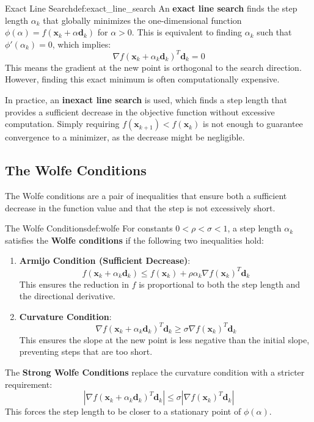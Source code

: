 \documentclass{MathNote}
\begin{document}
\begin{definition}{Exact Line Search}{def:exact_line_search}
	An \textbf{exact line search} finds the step length $\alpha_k$ that globally minimizes the one-dimensional function $\phi(\alpha) = f(\bm{x}_k + \alpha \bm{d}_k)$ for $\alpha > 0$. This is equivalent to finding $\alpha_k$ such that $\phi'(\alpha_k)=0$, which implies:
	$$ \nabla f(\bm{x}_k + \alpha_k \bm{d}_k)^T \bm{d}_k = 0 $$
	This means the gradient at the new point is orthogonal to the search direction. However, finding this exact minimum is often computationally expensive.
\end{definition}

In practice, an \textbf{inexact line search} is used, which finds a step length that provides a sufficient decrease in the objective function without excessive computation. Simply requiring $f(\bm{x}_{k+1}) < f(\bm{x}_k)$ is not enough to guarantee convergence to a minimizer, as the decrease might be negligible.

\subsection{The Wolfe Conditions}

The Wolfe conditions are a pair of inequalities that ensure both a sufficient decrease in the function value and that the step is not excessively short.

\begin{definition}{The Wolfe Conditions}{def:wolfe}
	For constants $0 < \rho < \sigma < 1$, a step length $\alpha_k$ satisfies the \textbf{Wolfe conditions} if the following two inequalities hold:
	\begin{enumerate}
		\item \textbf{Armijo Condition (Sufficient Decrease)}:
		$$ f(\bm{x}_k + \alpha_k \bm{d}_k) \le f(\bm{x}_k) + \rho \alpha_k \nabla f(\bm{x}_k)^T \bm{d}_k $$
		This ensures the reduction in $f$ is proportional to both the step length and the directional derivative.
		\item \textbf{Curvature Condition}:
		$$ \nabla f(\bm{x}_k + \alpha_k \bm{d}_k)^T \bm{d}_k \ge \sigma \nabla f(\bm{x}_k)^T \bm{d}_k $$
		This ensures the slope at the new point is less negative than the initial slope, preventing steps that are too short.
	\end{enumerate}
	The \textbf{Strong Wolfe Conditions} replace the curvature condition with a stricter requirement:
	$$ |\nabla f(\bm{x}_k + \alpha_k \bm{d}_k)^T \bm{d}_k| \le \sigma |\nabla f(\bm{x}_k)^T \bm{d}_k| $$
    This forces the step length to be closer to a stationary point of $\phi(\alpha)$.
\end{definition}
\end{document}
